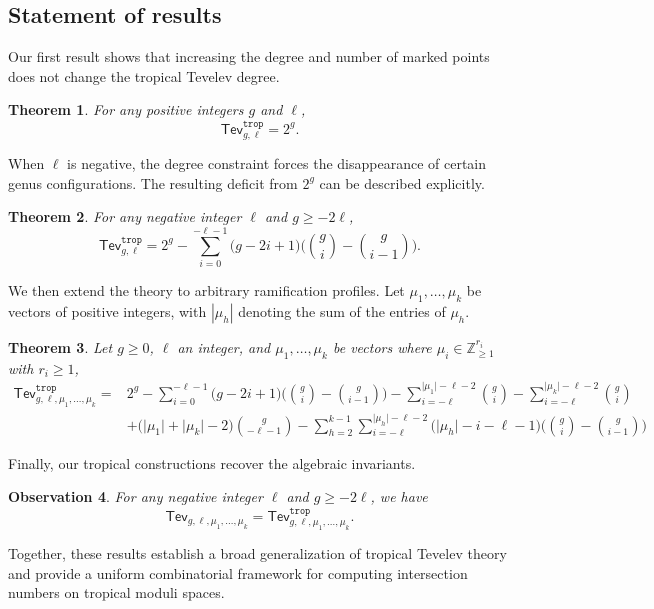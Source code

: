 \documentclass[11pt,reqno]{amsart}
\newtheorem{theorem}{Theorem}[section]
\newtheorem{obs}[theorem]{Observation}
\theoremstyle{definition}
\newcommand{\Z}{\mathds{Z}}
\newcommand\trop{{\mathtt{trop}}}
\newcommand{\Tev}{{\mathsf{Tev}}}
\begin{document}
\subsection{Statement of results}
Our first result shows that increasing the degree and number of marked points does not change the tropical Tevelev degree.
\begin{theorem}\label{thm:ellpositive}
    For any positive integers $g$ and $\ell$, 
    \[\Tev_{g,\ell}^\trop = 2^g.\]
\end{theorem}
When $\ell$ is negative, the degree constraint forces the disappearance of certain genus configurations. The resulting deficit from $2^g$ can be described explicitly.
\begin{theorem}\label{thm:ellnegative}
    For any negative integer $\ell$ and $g \geq -2\ell$, 
    \[\Tev^\trop_{g,\ell}= 2^g - \sum_{i=0}^{-\ell-1}\bigg(g-2i+1\bigg)\bigg({g\choose i}-{g \choose i-1}\bigg).\]
\end{theorem}
We then extend the theory to arbitrary ramification profiles. Let $\mu_1,\dots,\mu_k$ be vectors of positive integers, with $|\mu_h|$ denoting the sum of the entries of $\mu_h$.
\begin{theorem}\label{thm:higherram}
    Let $g\geq 0$, $\ell$ an integer, and $\mu_1,\dots,\mu_k$ be vectors where $\mu_i \in \Z_{\geq1}^{r_i}$ with $r_i\geq1$,
    \begin{align*}
        \Tev^\trop_{g,\ell,\mu_1,\dots,\mu_k}=&2^g - \sum_{i=0}^{-\ell-1}\bigg(g-2i+1\bigg)\bigg({g\choose i}-{g \choose i-1}\bigg)-\sum_{i=-\ell}^{\lvert\mu_1\rvert-\ell-2}{g\choose i}-\sum_{i=-\ell}^{\lvert\mu_k\rvert-\ell-2}{g\choose i}\\&+\bigg(\lvert\mu_1\rvert+\lvert\mu_k\rvert-2\bigg){g\choose-\ell-1}-\sum_{h=2}^{k-1}\sum_{i=-\ell}^{\lvert\mu_h\rvert-\ell-2}\bigg(\lvert\mu_h\rvert-i-\ell-1\bigg)\bigg({g\choose i}-{g \choose i-1}\bigg)
    \end{align*}

\end{theorem}
Finally, our tropical constructions recover the algebraic invariants.
\begin{obs}\label{obs:gencorrespondence}
For any negative integer $\ell$ and $g \geq -2\ell$, we have
\[\Tev_{g,\ell,\mu_1,\dots,\mu_k}=\Tev_{g,\ell,\mu_1,\dots,\mu_k}^\trop.\]
\end{obs}
Together, these results establish a broad generalization of tropical Tevelev theory and provide a uniform combinatorial framework for computing intersection numbers on tropical moduli spaces.
\end{document}
